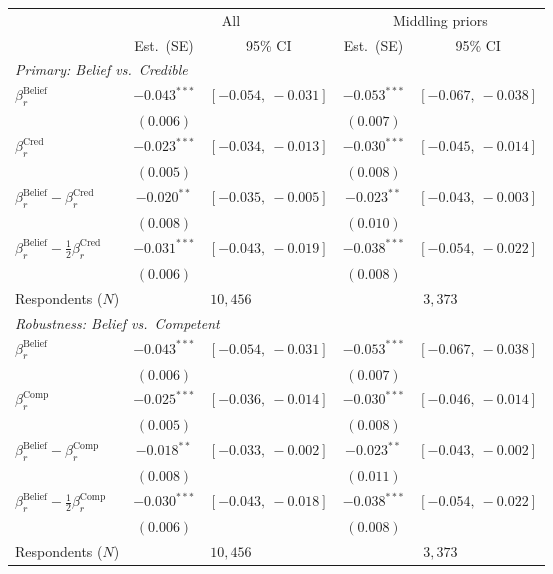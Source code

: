 \begin{table}[ht]
\centering
\begin{tabular}{l c c c c}
\hline
 & \multicolumn{2}{c}{All} & \multicolumn{2}{c}{Middling priors} \\
\cline{2-3}\cline{4-5}
 & Est.\ (SE) & 95\% CI & Est.\ (SE) & 95\% CI \\
\hline
\multicolumn{5}{l}{\textit{Primary: Belief vs.\ Credible}} \\
$\beta_r^{\mathrm{Belief}}$ & $-0.043^{***}$ & $[-0.054,\ -0.031]$ & $-0.053^{***}$ & $[-0.067,\ -0.038]$ \\
 & $(0.006)$ & & $(0.007)$ & \\
$\beta_r^{\mathrm{Cred}}$ & $-0.023^{***}$ & $[-0.034,\ -0.013]$ & $-0.030^{***}$ & $[-0.045,\ -0.014]$ \\
 & $(0.005)$ & & $(0.008)$ & \\
$\beta_r^{\mathrm{Belief}}-\beta_r^{\mathrm{Cred}}$ & $-0.020^{**}$ & $[-0.035,\ -0.005]$ & $-0.023^{**}$ & $[-0.043,\ -0.003]$ \\
 & $(0.008)$ & & $(0.010)$ & \\
$\beta_r^{\mathrm{Belief}}-\tfrac12\beta_r^{\mathrm{Cred}}$ & $-0.031^{***}$ & $[-0.043,\ -0.019]$ & $-0.038^{***}$ & $[-0.054,\ -0.022]$ \\
 & $(0.006)$ & & $(0.008)$ & \\
Respondents ($N$) & \multicolumn{2}{c}{$10{,}456$} & \multicolumn{2}{c}{$3{,}373$} \\
\hline
\multicolumn{5}{l}{\textit{Robustness: Belief vs.\ Competent}} \\
$\beta_r^{\mathrm{Belief}}$ & $-0.043^{***}$ & $[-0.054,\ -0.031]$ & $-0.053^{***}$ & $[-0.067,\ -0.038]$ \\
 & $(0.006)$ & & $(0.007)$ & \\
$\beta_r^{\mathrm{Comp}}$ & $-0.025^{***}$ & $[-0.036,\ -0.014]$ & $-0.030^{***}$ & $[-0.046,\ -0.014]$ \\
 & $(0.005)$ & & $(0.008)$ & \\
$\beta_r^{\mathrm{Belief}}-\beta_r^{\mathrm{Comp}}$ & $-0.018^{**}$ & $[-0.033,\ -0.002]$ & $-0.023^{**}$ & $[-0.043,\ -0.002]$ \\
 & $(0.008)$ & & $(0.011)$ & \\
$\beta_r^{\mathrm{Belief}}-\tfrac12\beta_r^{\mathrm{Comp}}$ & $-0.030^{***}$ & $[-0.043,\ -0.018]$ & $-0.038^{***}$ & $[-0.054,\ -0.022]$ \\
 & $(0.006)$ & & $(0.008)$ & \\
Respondents ($N$) & \multicolumn{2}{c}{$10{,}456$} & \multicolumn{2}{c}{$3{,}373$} \\

\end{tabular}
\end{table}
